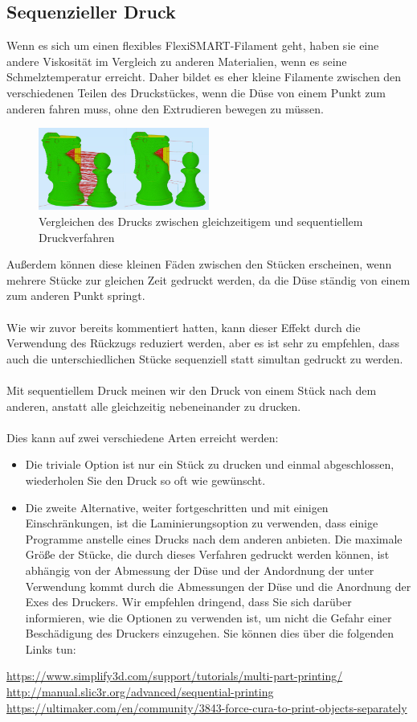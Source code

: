 \documentclass[11pt,a4paper]{article}
\begin{document}
	\subsection{Sequenzieller Druck}
Wenn es sich um einen flexibles FlexiSMART-Filament geht, haben sie eine andere Viskosität im Vergleich zu anderen Materialien, wenn es seine Schmelztemperatur erreicht. Daher bildet es eher kleine Filamente zwischen den verschiedenen Teilen des Druckstückes, wenn die Düse von einem Punkt zum anderen fahren muss, ohne den Extrudieren bewegen zu müssen.
\begin{figure}[H]
\centering
\includegraphics[width=0.5\textwidth,cfbox=azul_marcos 4pt 0pt]{FOTOS/SEQUENTIALPRINTING}
\caption*{Vergleichen des Drucks zwischen gleichzeitigem und sequentiellem Druckverfahren}
\end{figure}
Außerdem können diese kleinen Fäden zwischen den Stücken erscheinen, wenn mehrere Stücke zur gleichen Zeit gedruckt werden, da die Düse ständig von einem zum anderen Punkt springt.
\\\\
Wie wir zuvor bereits kommentiert hatten, kann dieser Effekt durch die Verwendung des Rückzugs reduziert werden, aber es ist sehr zu empfehlen, dass auch die unterschiedlichen Stücke sequenziell statt simultan gedruckt zu werden.
\\\\
Mit sequentiellem Druck meinen wir den Druck von einem Stück nach dem anderen, anstatt alle gleichzeitig nebeneinander zu drucken.
\\\\
Dies kann auf zwei verschiedene Arten erreicht werden:
\begin{itemize}
\item Die triviale Option ist nur ein Stück zu drucken und einmal abgeschlossen, wiederholen Sie den Druck so oft wie gewünscht.
\item Die zweite Alternative, weiter fortgeschritten und mit einigen Einschränkungen, ist die Laminierungsoption zu verwenden, dass einige Programme anstelle eines Drucks nach dem anderen anbieten. Die maximale Größe der Stücke, die durch dieses Verfahren gedruckt werden können, ist abhängig von der Abmessung der Düse und der Andordnung der unter Verwendung kommt durch die Abmessungen der Düse und die Anordnung der Exes des Druckers. Wir empfehlen dringend, dass Sie sich darüber informieren, wie die Optionen zu verwenden ist, um nicht die Gefahr einer Beschädigung des Druckers einzugehen. Sie können dies über die folgenden Links tun: 
\end{itemize}
\url{https://www.simplify3d.com/support/tutorials/multi-part-printing/}\\
\url{http://manual.slic3r.org/advanced/sequential-printing}\\
\url{https://ultimaker.com/en/community/3843-force-cura-to-print-objects-separately}
\end{document}
